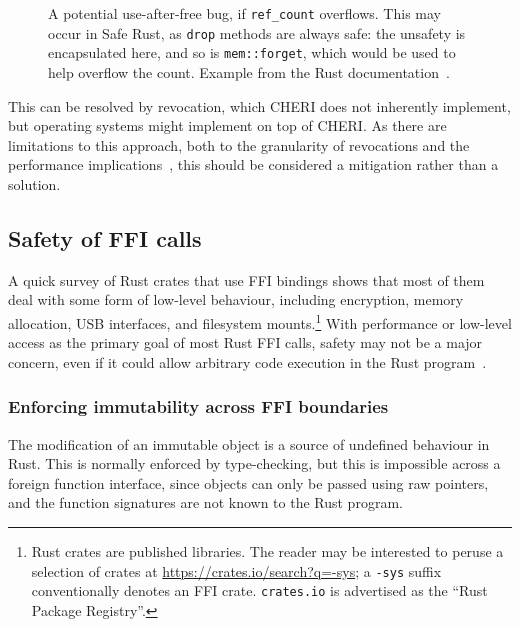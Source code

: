 \documentclass[dissertation.tex]{subfiles}
\begin{document}
\begin{figure}[ht]
    
    \caption{
        A potential use-after-free bug, if \texttt{ref\_count}
        overflows.
        This may occur in Safe Rust, as \texttt{drop} methods are always
        safe: the unsafety is encapsulated here, and so is
        \texttt{mem::forget}, which would be used to help overflow the count.
        Example from the Rust documentation~\cite{rust-nomicon-rc-leak}.
    }
    \label{lst:eval-rust-rc-drop}
\end{figure}

This can be resolved by revocation, which CHERI does not inherently
implement, but operating systems might implement on top of CHERI.
As there are limitations to this approach, both to the granularity of
revocations and the performance implications~\cite{cheri-v6}, this
should be considered a mitigation rather than a solution.


\subsection{Safety of FFI calls}
\label{sec:eval-rust-xprocess}


A quick survey of Rust crates that use FFI bindings shows that most of
them deal with some form of low-level behaviour, including encryption,
memory allocation, USB interfaces, and filesystem mounts.\footnote{
    Rust crates are published libraries.
    The reader may be interested to peruse a selection of crates at
    \url{https://crates.io/search?q=-sys};
    a \texttt{-sys} suffix conventionally denotes an FFI crate.
    \texttt{crates.io} is advertised as the ``Rust Package Registry''.
}
With performance or low-level access as the primary goal of most Rust
FFI calls, safety may not be a major concern, even if it could allow
arbitrary code execution in the Rust
program~\cite{szekeres-eternal-war}.

\subsubsection{Enforcing immutability across FFI boundaries}
The modification of an immutable object is a source of undefined
behaviour in Rust.
This is normally enforced by type-checking, but this is impossible
across a foreign function interface, since objects can only be passed
using raw pointers, and the function signatures are not known to the
Rust program.
\end{document}
